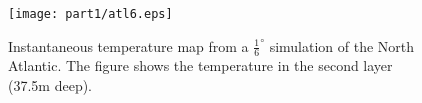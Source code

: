\begin{figure}
 \begin{center}
  \texttt{[image: part1/atl6.eps]}
 \end{center}
\caption{Instantaneous temperature map from a $\frac{1}{6}^{\circ }$
simulation of the North Atlantic. The figure
shows the temperature in the second layer (37.5m
deep).}
\label{fig:ocean-gyres}
\end{figure}
